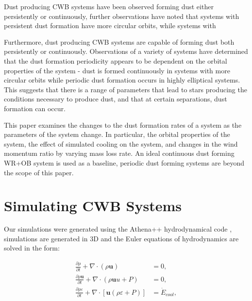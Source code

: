 
Dust producing CWB systems have been observed forming dust either persistently or continuously, further observations have noted that systems with persistent dust formation have more circular orbits, while systems with 

Furthermore, dust producing CWB systems are capable of forming dust both persistently or continuously.
Observations of a variety of systems have determined that the dust formation periodicity appears to be dependent on the orbital properties of the system - dust is formed continuously in systems with more circular orbits while periodic dust formation occurs in highly elliptical systems. This suggests that there is a range of parameters that lead to stars producing the conditions necessary to produce dust, and that at certain separations, dust formation can occur.




This paper examines the changes to the dust formation rates of a system as the parameters of the system change. In particular, the orbital properties of the system, the effect of simulated cooling on the system, and changes in the wind momentum ratio by varying mass loss rate. An ideal continuous dust forming WR+OB system is used as a baseline, periodic dust forming systems are beyond the scope of this paper. 


\section{Simulating CWB Systems}



Our simulations were generated using the Athena++ hydrodynamical code \cite{stoneAthenaAdaptiveMesh2020}, simulations are generated in 3D and the Euler equations of hydrodynamics are solved in the form:



\begin{subequations}
  \begin{align}
    \frac{\partial\rho}{\partial t}+\nabla \cdot \left(\rho \boldsymbol{u}\right) & = 0 , \\
    \frac{\partial \rho \boldsymbol{u}}{\partial t} + \nabla \cdot \left(\rho \boldsymbol{u} u + P \right) & = 0, \\
    \frac{\partial \rho \varepsilon}{\partial t} + \nabla \cdot \left[ \boldsymbol{u} \left( \rho\varepsilon + P \right) \right] & = \dot E_{cool} , 
  \end{align}
\end{subequations}

